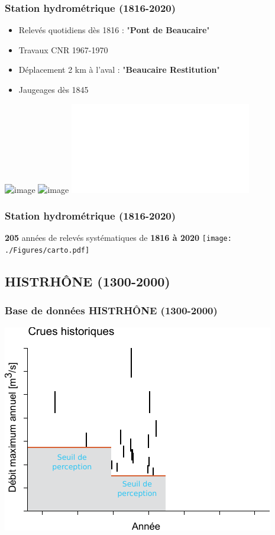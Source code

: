 \documentclass[compress,9pt]{beamer}
\begin{document}
	\begin{frame}%
		\frametitle{Station hydrométrique (1816-2020)}
		\begin{minipage}{.45\textwidth}
			\begin{itemize}
				\item<1->[$\vartriangleright$] Relevés quotidiens dès 1816 : "\textbf{Pont de Beaucaire}"
				\vspace{2pt}
				\item<2->[$\vartriangleright$] Travaux CNR 1967-1970
				\vspace{2pt}
				\item<3->[$\vartriangleright$] Déplacement 2 km à l'aval : "\textbf{Beaucaire Restitution}"
				\vspace{2pt}
				\item<5->[$\vartriangleright$] Jaugeages dès 1845
			\end{itemize}
		\end{minipage}
		\begin{minipage}{.53\textwidth}
			\begin{center}
	      		\includegraphics<1>[width = .9\columnwidth]{./Figures/TabObs.jpg} 
	      		\includegraphics<2-4>[width = .9\columnwidth]{./Figures/Vallab.jpg} 
	      		\includegraphics<5>[width = .9\textwidth]{./Figures/Jaus.pdf}
			\end{center}
		\end{minipage}
	\end{frame}
	
	\begin{frame}%
		\frametitle{Station hydrométrique (1816-2020)}
		\textbf{205} années de relevés systématiques de \textbf{1816 à 2020}
		\vfill
		\centering
		\texttt{[image: ./Figures/carto.pdf]} 
	\end{frame}
	
 	\subsection{HISTRHÔNE (1300-2000)}
	\begin{frame}%
		\frametitle{Base de données HISTRHÔNE (1300-2000)}
		\centering
      	\includegraphics[width = .7\textwidth]{./Figures/HistoFloods2.pdf}
	\end{frame}	 	
 	
\end{document}
